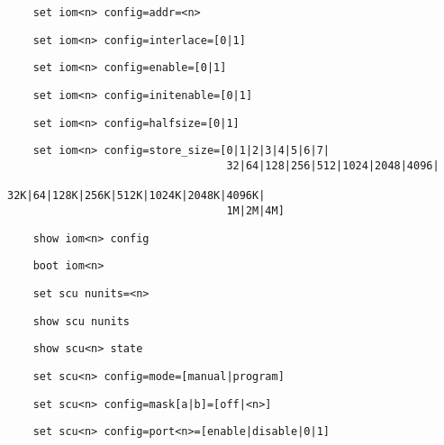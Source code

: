 \documentclass[notitlepage]{report}
\begin{document}
\begin{lstlisting}
	set iom<n> config=addr=<n>
\end{lstlisting}

\begin{lstlisting}
	set iom<n> config=interlace=[0|1]
\end{lstlisting}

\begin{lstlisting}
	set iom<n> config=enable=[0|1]
\end{lstlisting}

\begin{lstlisting}
	set iom<n> config=initenable=[0|1]
\end{lstlisting}

\begin{lstlisting}
	set iom<n> config=halfsize=[0|1]
\end{lstlisting}

\begin{lstlisting}
	set iom<n> config=store_size=[0|1|2|3|4|5|6|7|
		                          32|64|128|256|512|1024|2048|4096|
		                          32K|64|128K|256K|512K|1024K|2048K|4096K|
		                          1M|2M|4M]
\end{lstlisting}

\begin{lstlisting}
	show iom<n> config
\end{lstlisting}

\begin{lstlisting}
	boot iom<n>
\end{lstlisting}

\begin{lstlisting}
	set scu nunits=<n>
\end{lstlisting}

\begin{lstlisting}
	show scu nunits
\end{lstlisting}

\begin{lstlisting}
	show scu<n> state
\end{lstlisting}

\begin{lstlisting}
	set scu<n> config=mode=[manual|program]
\end{lstlisting}

\begin{lstlisting}
	set scu<n> config=mask[a|b]=[off|<n>]
\end{lstlisting}

\begin{lstlisting}
	set scu<n> config=port<n>=[enable|disable|0|1]
\end{lstlisting}
\end{document}
